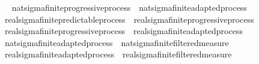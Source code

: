 \begin{isabellebody}
\isadelimproof
\ %
\endisadelimproof
%
\isatagproof
\isacommand{{\isachardot}{\kern0pt}{\isachardot}{\kern0pt}}\isamarkupfalse%
%
\endisatagproof
{\isafoldproof}%
%
\isadelimproof
%
\endisadelimproof
\isanewline
{}\isamarkupfalse%
\ nat{\isacharunderscore}{\kern0pt}sigma{\isacharunderscore}{\kern0pt}finite{\isacharunderscore}{\kern0pt}progressive{\isacharunderscore}{\kern0pt}process\ {\isasymsubseteq}\ nat{\isacharunderscore}{\kern0pt}sigma{\isacharunderscore}{\kern0pt}finite{\isacharunderscore}{\kern0pt}adapted{\isacharunderscore}{\kern0pt}process%
\isadelimproof
\ %
\endisadelimproof
%
\isatagproof
\isacommand{{\isachardot}{\kern0pt}{\isachardot}{\kern0pt}}\isamarkupfalse%
%
\endisatagproof
{\isafoldproof}%
%
\isadelimproof
%
\endisadelimproof
\ \isanewline
\isanewline
{}\isamarkupfalse%
\ real{\isacharunderscore}{\kern0pt}sigma{\isacharunderscore}{\kern0pt}finite{\isacharunderscore}{\kern0pt}predictable{\isacharunderscore}{\kern0pt}process\ {\isasymsubseteq}\ real{\isacharunderscore}{\kern0pt}sigma{\isacharunderscore}{\kern0pt}finite{\isacharunderscore}{\kern0pt}progressive{\isacharunderscore}{\kern0pt}process%
\isadelimproof
\ %
\endisadelimproof
%
\isatagproof
\isacommand{{\isachardot}{\kern0pt}{\isachardot}{\kern0pt}}\isamarkupfalse%
%
\endisatagproof
{\isafoldproof}%
%
\isadelimproof
%
\endisadelimproof
\isanewline
{}\isamarkupfalse%
\ real{\isacharunderscore}{\kern0pt}sigma{\isacharunderscore}{\kern0pt}finite{\isacharunderscore}{\kern0pt}progressive{\isacharunderscore}{\kern0pt}process\ {\isasymsubseteq}\ real{\isacharunderscore}{\kern0pt}sigma{\isacharunderscore}{\kern0pt}finite{\isacharunderscore}{\kern0pt}adapted{\isacharunderscore}{\kern0pt}process%
\isadelimproof
\ %
\endisadelimproof
%
\isatagproof
\isacommand{{\isachardot}{\kern0pt}{\isachardot}{\kern0pt}}\isamarkupfalse%
%
\endisatagproof
{\isafoldproof}%
%
\isadelimproof
%
\endisadelimproof
\isanewline
\isanewline
{}\isamarkupfalse%
\ nat{\isacharunderscore}{\kern0pt}sigma{\isacharunderscore}{\kern0pt}finite{\isacharunderscore}{\kern0pt}adapted{\isacharunderscore}{\kern0pt}process\ {\isasymsubseteq}\ nat{\isacharunderscore}{\kern0pt}sigma{\isacharunderscore}{\kern0pt}finite{\isacharunderscore}{\kern0pt}filtered{\isacharunderscore}{\kern0pt}measure%
\isadelimproof
\ %
\endisadelimproof
%
\isatagproof
\isacommand{{\isachardot}{\kern0pt}{\isachardot}{\kern0pt}}\isamarkupfalse%
%
\endisatagproof
{\isafoldproof}%
%
\isadelimproof
%
\endisadelimproof
\isanewline
{}\isamarkupfalse%
\ real{\isacharunderscore}{\kern0pt}sigma{\isacharunderscore}{\kern0pt}finite{\isacharunderscore}{\kern0pt}adapted{\isacharunderscore}{\kern0pt}process\ {\isasymsubseteq}\ real{\isacharunderscore}{\kern0pt}sigma{\isacharunderscore}{\kern0pt}finite{\isacharunderscore}{\kern0pt}filtered{\isacharunderscore}{\kern0pt}measure%

\end{isabellebody}
